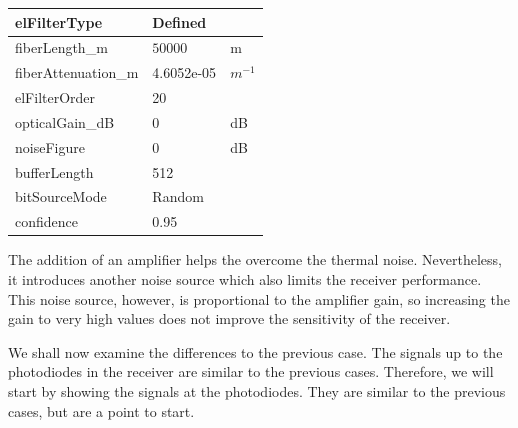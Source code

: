 \begin{longtable}[h]{|l|l|l|}
	elFilterType                  & Defined              & \\\hline
	fiberLength\_m                & $50 000$             & m \\\hline
	fiberAttenuation\_m           & 4.6052e-05           & $m^{-1}$ \\\hline
	elFilterOrder                 & 20                   & \\\hline
	opticalGain\_dB               & 0                    & dB \\\hline
	noiseFigure                   & 0                    & dB \\\hline
	bufferLength                  & 512                  & \\\hline
	bitSourceMode                 & Random               & \\\hline
	confidence                    & 0.95                 & \\\hline
\end{longtable}



The addition of an amplifier helps the overcome the thermal noise. 
Nevertheless, it introduces another noise source which also limits the receiver 
performance. This noise source, however, is proportional to the amplifier gain, 
so increasing the gain to very high values does not improve the sensitivity of 
the receiver.

We shall now examine the differences to the previous case. The signals up to 
the photodiodes in the receiver are similar to the previous cases. Therefore, 
we will start by showing the signals at the photodiodes. They are similar to 
the previous cases, but are a point to start.

